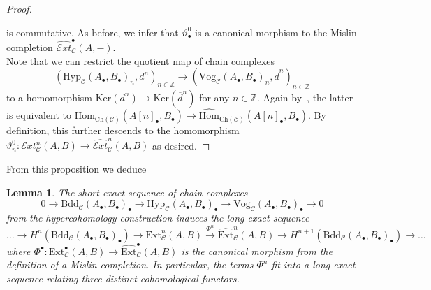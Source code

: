 \documentclass[12pt, a4paper]{article}
\numberwithin{equation}{section}
\newtheorem{lem}[thm]{Lemma}
\theoremstyle{empty}
\theoremstyle{nonumberplain}
\newtheorem{proof}{Proof}
\begin{document}
\begin{proof}
\begin{center}
\end{center}
is commutative. As before, we infer that $\vartheta_{\bullet}^0$ is a canonical morphism to the Mislin completion $\widehat{\mathcal{E}xt}_{\mathcal{C}}^{\bullet}(A, -)$. \\

Note that we can restrict the quotient map of chain complexes
\[ (\mathrm{Hyp}_{\mathcal{C}}(A_{\bullet}, B_{\bullet})_n, d^n)_{n \in \mathbb{Z}} \rightarrow (\mathrm{Vog}_{\mathcal{C}}(A_{\bullet}, B_{\bullet})_n, \overline{d}^n)_{n \in \mathbb{Z}} \]
to a homomorphism $\mathrm{Ker}(d^n) \rightarrow \mathrm{Ker}(\overline{d}^n)$ for any $n \in \mathbb{Z}$. Again by~\cite[Notation~6.1]{ghe24}, the latter is equivalent to $\mathrm{Hom}_{\mathrm{Ch}(\mathcal{C})}(A[n]_{\bullet}, B_{\bullet}) \rightarrow \widehat{\mathrm{Hom}}_{\mathrm{Ch}(\mathcal{C})}(A[n]_{\bullet}, B_{\bullet})$. By definition, this further descends to the homomorphism $\vartheta_n^0: \mathcal{E}xt_{\mathcal{C}}^n(A, B) \rightarrow \widehat{\mathcal{E}xt}_{\mathcal{C}}^n(A, B)$ as desired.
\end{proof}

From this proposition we deduce

\begin{lem}\label{lem:lesandcanmorphism}
The short exact sequence of chain complexes
\[  0 \rightarrow \mathrm{Bdd}_{\mathcal{C}}(A_{\bullet}, B_{\bullet})_{\bullet} \rightarrow \mathrm{Hyp}_{\mathcal{C}}(A_{\bullet}, B_{\bullet})_{\bullet} \rightarrow \mathrm{Vog}_{\mathcal{C}}(A_{\bullet}, B_{\bullet})_{\bullet} \rightarrow 0 \]
from the hypercohomology construction induces the long exact sequence
\[ \dots {} \rightarrow H^n(\mathrm{Bdd}_{\mathcal{C}}(A_{\bullet}, B_{\bullet})_{\bullet}) \rightarrow \mathrm{Ext}_{\mathcal{C}}^n(A, B) \xrightarrow{\Phi^n} \widehat{\mathrm{Ext}}_{\mathcal{C}}^n(A, B) 
\rightarrow H^{n+1}(\mathrm{Bdd}_{\mathcal{C}}(A_{\bullet}, B_{\bullet})_{\bullet}) \rightarrow {} \dots \]
where $\Phi^{\bullet}: \mathrm{Ext}_{\mathcal{C}}^{\bullet}(A, B) \rightarrow \widehat{\mathrm{Ext}}_{\mathcal{C}}^{\bullet}(A, B)$ is the canonical morphism from the definition of a Mislin completion. In particular, the terms $\Phi^n$ fit into a long exact sequence relating three distinct cohomological functors.
\end{lem}
\end{document}
